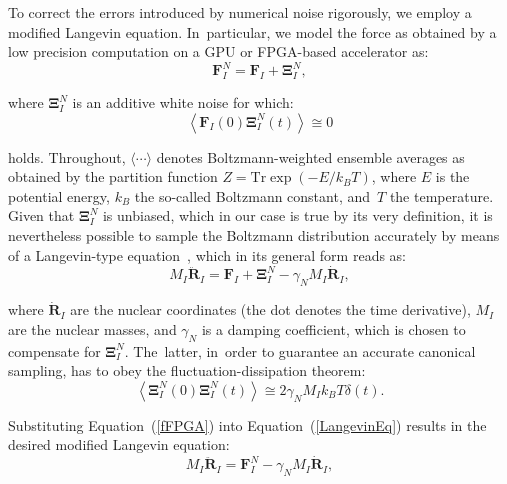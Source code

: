 \documentclass[computation,article,accept,moreauthors,pdftex]{Definitions/mdpi}
\begin{document}
To correct the errors introduced by numerical noise rigorously, we employ a modified Langevin equation. In~particular, we model the force as obtained by a low precision computation on a GPU or FPGA-based accelerator as:
\begin{equation} \label{fFPGA}
\textbf{F}_{I}^{N} = \textbf{F}_{I} + \mathbf{\Xi }_{I}^{N},
\end{equation}

\noindent where $\mathbf{\Xi }_{I}^{N}$ is an additive white noise for which:
\begin{equation} \label{CrossCorr}
 \left \langle \textbf{F}_{I}\left ( 0 \right ) \mathbf{\Xi } _{I}^{N}\left ( t \right )\right \rangle \cong 0
\end{equation}

\noindent holds. Throughout, $\langle \cdots \rangle$ denotes Boltzmann-weighted ensemble averages as obtained by the partition function $Z=\text{Tr} \exp(-E/k_B T)$, where $E$ is the potential energy, $k_B$ the so-called Boltzmann constant, and~$T$ the temperature. Given that $\mathbf{\Xi }_{I}^{N}$ is unbiased, which in our case is true by its very definition, it is nevertheless possible to sample the Boltzmann distribution accurately by means of a Langevin-type equation~\cite{Krajewski,Richters,Karhan}, which in its general form reads as:
\begin{equation} \label{LangevinEq}
M_{I}\ddot{\textbf{R}}_{I}=\textbf{F}_{I}+\mathbf{\Xi }_{I}^{N}-\gamma _{N}M_{I}\dot{\textbf{R}}_{I},
\end{equation}

\noindent where $\dot{\textbf{R}}_{I}$ are the nuclear coordinates (the dot denotes the time derivative), $M_I$ are the nuclear masses, and $\gamma _{N}$ is a damping coefficient,
which is chosen to compensate for \(\mathbf{\Xi }_{I}^{N}\). The~latter, in~order to guarantee an accurate canonical sampling, has to obey
the fluctuation-dissipation theorem:
\begin{equation}
\left \langle \mathbf{\Xi }_{I}^{N}\left ( 0 \right ) \mathbf{\Xi }_{I}^{N}\left ( t \right ) \right \rangle \cong 2 \gamma_{N} M_I k_{B} T \delta \left ( t \right ).
\label{FDT}
\end{equation}

Substituting Equation~(\ref{fFPGA}) into Equation~(\ref{LangevinEq}) results in the desired modified Langevin equation:
\begin{equation} \label{modLangevin}
M_{I}\ddot{\textbf{R}}_{I} = \textbf{F}_{I}^{N}-\gamma _{N}M_{I}\dot{\textbf{R}}_{I},
\end{equation}
\end{document}
